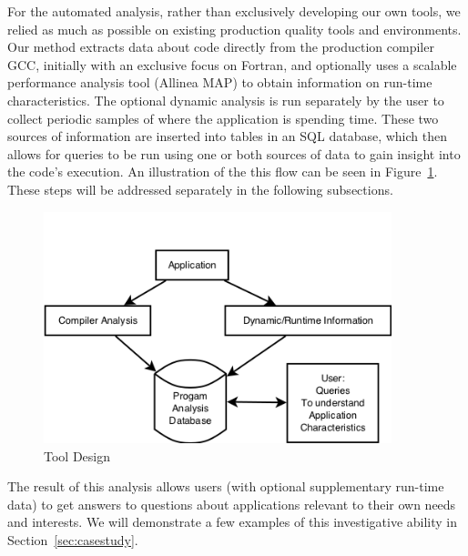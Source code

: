 For the automated analysis, rather than exclusively developing our own tools, we relied as much as possible on existing production quality tools and environments.
Our method extracts data about code directly from the production compiler \acs{GCC}, initially with an exclusive focus on Fortran, and optionally uses a scalable performance analysis tool (Allinea MAP) to obtain information on run-time characteristics.
The optional dynamic analysis is run separately by the user to collect periodic samples of where the application is spending time.
These two sources of information are inserted into tables in an \acs{SQL} database, which then allows for queries to be run using one or both sources of data to gain insight into the code's execution.
An illustration of the this flow can be seen in Figure~\ref{fig:design}.
These steps will be addressed separately in the following subsections.

\begin{figure}
\begin{center}
\includegraphics[width=0.9\textwidth]{images/design.png}
\end{center}
\caption{Tool Design}
\label{fig:design}
\end{figure}

The result of this analysis allows users (with optional supplementary run-time data) to get answers to questions about applications relevant to their own needs and interests.
We will demonstrate a few examples of this investigative ability in Section~\ref{sec:casestudy}.

